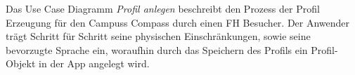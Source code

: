 \noindent Das Use Case Diagramm \emph{Profil anlegen} beschreibt den Prozess der Profil Erzeugung für den Campuss Compass durch einen FH Besucher. Der Anwender trägt Schritt für Schritt seine physischen Einschränkungen, sowie seine bevorzugte Sprache ein, woraufhin durch das Speichern des Profils ein Profil-Objekt in der App angelegt wird.
